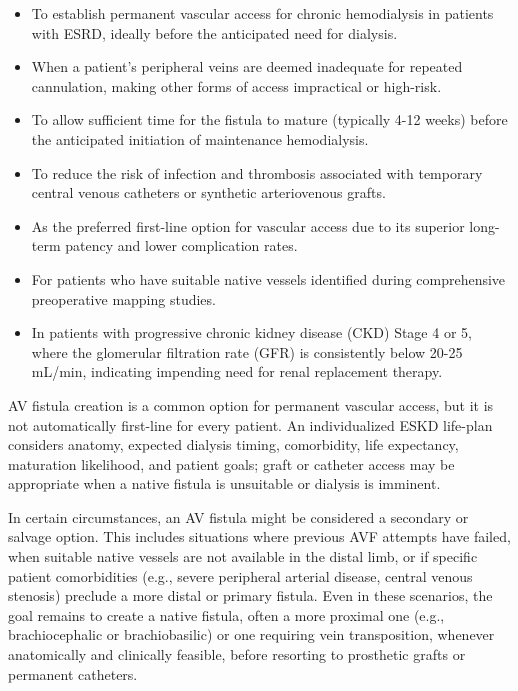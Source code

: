 \begin{itemize}
  \item To establish permanent vascular access for chronic hemodialysis in patients with ESRD, ideally before the anticipated need for dialysis.
  \item When a patient's peripheral veins are deemed inadequate for repeated cannulation, making other forms of access impractical or high-risk.
  \item To allow sufficient time for the fistula to mature (typically 4-12 weeks) before the anticipated initiation of maintenance hemodialysis.
  \item To reduce the risk of infection and thrombosis associated with temporary central venous catheters or synthetic arteriovenous grafts.
  \item As the preferred first-line option for vascular access due to its superior long-term patency and lower complication rates.
  \item For patients who have suitable native vessels identified during comprehensive preoperative mapping studies.
  \item In patients with progressive chronic kidney disease (CKD) Stage 4 or 5, where the glomerular filtration rate (GFR) is consistently below 20-25 mL/min, indicating impending need for renal replacement therapy.
\end{itemize}

AV fistula creation is a common option for permanent vascular access, but it is not automatically first-line for every patient. An individualized ESKD life-plan considers anatomy, expected dialysis timing, comorbidity, life expectancy, maturation likelihood, and patient goals; graft or catheter access may be appropriate when a native fistula is unsuitable or dialysis is imminent.

In certain circumstances, an AV fistula might be considered a secondary or salvage option. This includes situations where previous AVF attempts have failed, when suitable native vessels are not available in the distal limb, or if specific patient comorbidities (e.g., severe peripheral arterial disease, central venous stenosis) preclude a more distal or primary fistula. Even in these scenarios, the goal remains to create a native fistula, often a more proximal one (e.g., brachiocephalic or brachiobasilic) or one requiring vein transposition, whenever anatomically and clinically feasible, before resorting to prosthetic grafts or permanent catheters.

